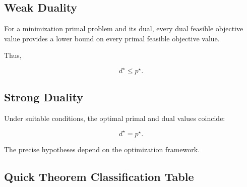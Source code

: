 \subsection{Weak Duality}
\label{subsec:weak-duality-summary}

For a minimization primal problem and its dual, every dual feasible objective
value provides a lower bound on every primal feasible objective value.

Thus,

\[
\boxed{
d^\star
\leq
p^\star.
}
\]

\subsection{Strong Duality}
\label{subsec:strong-duality-summary}

Under suitable conditions, the optimal primal and dual values coincide:

\[
\boxed{
d^\star
=
p^\star.
}
\]

The precise hypotheses depend on the optimization framework.

\subsection{Quick Theorem Classification Table}
\label{subsec:quick-theorem-classification}

